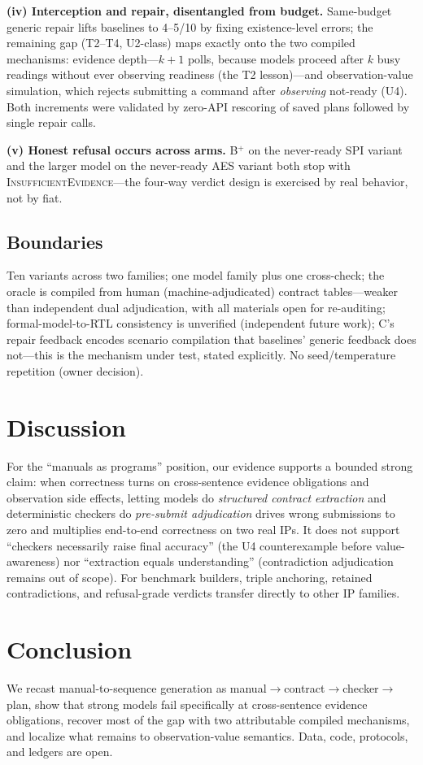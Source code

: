 \documentclass[conference]{IEEEtran}
\begin{document}
\textbf{(iv) Interception and repair, disentangled from budget.}
Same-budget generic repair lifts baselines to 4--5/10 by fixing
existence-level errors; the remaining gap (T2--T4, U2-class) maps
exactly onto the two compiled mechanisms: evidence depth---$k{+}1$
polls, because models proceed after $k$ busy readings without ever
observing readiness (the T2 lesson)---and observation-value simulation,
which rejects submitting a command after \emph{observing} not-ready
(U4). Both increments were validated by zero-API rescoring of saved
plans followed by single repair calls.

\textbf{(v) Honest refusal occurs across arms.} B$^+$ on the
never-ready SPI variant and the larger model on the never-ready AES
variant both stop with \textsc{InsufficientEvidence}---the four-way
verdict design is exercised by real behavior, not by fiat.

\subsection{Boundaries}
Ten variants across two families; one model family plus one
cross-check; the oracle is compiled from human (machine-adjudicated)
contract tables---weaker than independent dual adjudication, with all
materials open for re-auditing; formal-model-to-RTL consistency is
unverified (independent future work); C's repair feedback encodes
scenario compilation that baselines' generic feedback does not---this
is the mechanism under test, stated explicitly. No seed/temperature
repetition (owner decision).

\section{Discussion}
For the ``manuals as programs'' position, our evidence supports a
bounded strong claim: when correctness turns on cross-sentence evidence
obligations and observation side effects, letting models do
\emph{structured contract extraction} and deterministic checkers do
\emph{pre-submit adjudication} drives wrong submissions to zero and
multiplies end-to-end correctness on two real IPs. It does not support
``checkers necessarily raise final accuracy'' (the U4 counterexample
before value-awareness) nor ``extraction equals understanding''
(contradiction adjudication remains out of scope). For benchmark
builders, triple anchoring, retained contradictions, and refusal-grade
verdicts transfer directly to other IP families.

\section{Conclusion}
We recast manual-to-sequence generation as
manual$\rightarrow$contract$\rightarrow$checker$\rightarrow$plan, show
that strong models fail specifically at cross-sentence evidence
obligations, recover most of the gap with two attributable compiled
mechanisms, and localize what remains to observation-value semantics.
Data, code, protocols, and ledgers are open.
\end{document}
